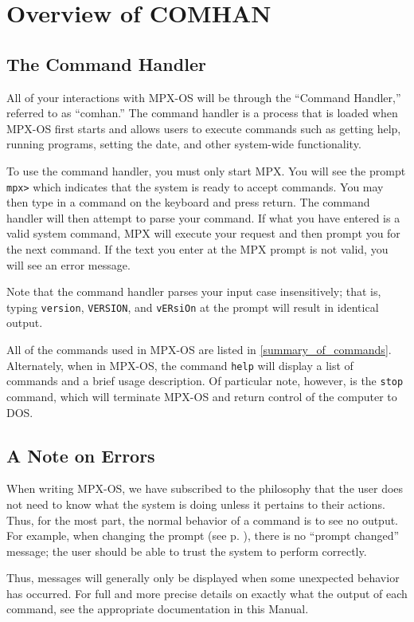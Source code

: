 \chapter{Overview of COMHAN}
\label{overview_of_comhan}

\section{The Command Handler}

All of your interactions with MPX-OS  will be through the
``Command Handler,''  referred to
as ``comhan.'' The command handler is a process that is loaded when MPX-OS first starts
and allows users to execute commands such as getting help, running programs, setting the
date, and other system-wide functionality.

To use the command handler, you must only start MPX. You will see the prompt {\tt mpx>}
which indicates that the system is ready to accept commands. You may then type in a 
command on the keyboard and press return. The command handler will then attempt to parse 
your command. If what you have entered is a valid system command, MPX will execute your 
request and then prompt you for the next command. If the text you enter at the MPX prompt
is not valid, you will see an error message.

Note that the command handler parses your input case insensitively; that is, typing 
{\tt version}, {\tt VERSION}, and {\tt vERsiOn} at the prompt will result in identical 
output.

All of the commands used in MPX-OS are listed in \ref{summary_of_commands}. Alternately,
when in MPX-OS, the command {\tt help} will display a list of commands and a brief usage
description. Of particular note, however, is the {\tt stop} command, which will terminate
MPX-OS and return control of the computer to DOS.

\section{A Note on Errors}

When writing MPX-OS, we have subscribed to the philosophy that the user does not need to 
know what the system is doing unless it pertains to their actions. Thus, for the most part,
the normal behavior of a command is to see no output. For example, when changing the 
prompt (see p. \pageref{prompt_cmd}), there is no ``prompt changed'' message; the user
should be able to trust the system to perform correctly.

Thus, messages will generally only be displayed when some unexpected behavior has occurred. 
For full and more precise details on exactly what the output of each command, see the
appropriate documentation in this Manual.
